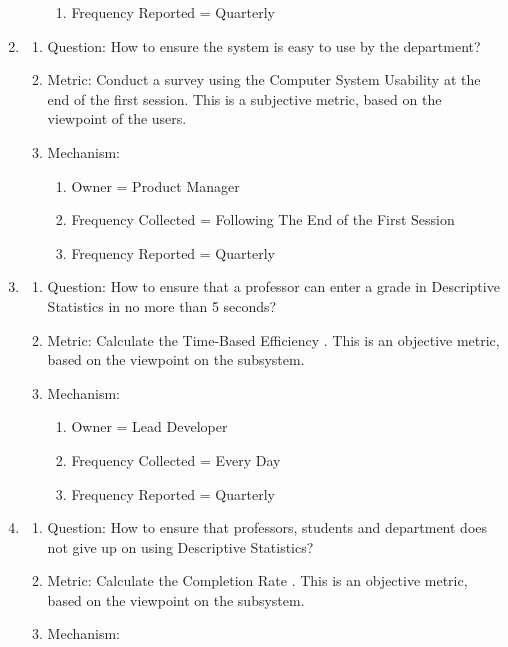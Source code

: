 \documentclass[11pt]{article}
\begin{document}
\begin{enumerate}
\begin{enumerate}
\begin{enumerate}
    \item Frequency Reported = Quarterly
    \end{enumerate}
\end{enumerate}
\item
	\begin{enumerate}
    \item Question: How to ensure the system is easy to use by the department?
    \item Metric: Conduct a survey using the Computer System Usability \cite{mifsud} at the end of the first session. This is a subjective metric, based on the viewpoint of the users.
    \item Mechanism:
	\begin{enumerate}
    \item Owner = Product Manager
    \item Frequency Collected = Following The End of the First Session
    \item Frequency Reported = Quarterly
    \end{enumerate}
\end{enumerate}
\item
	\begin{enumerate}
    \item Question: How to ensure that a professor can enter a grade in Descriptive Statistics in no more than 5 seconds?
    \item Metric: Calculate the Time-Based Efficiency \cite{mifsud}. This is an objective metric, based on the viewpoint on the subsystem.
    \item Mechanism:
	\begin{enumerate}
    \item Owner = Lead Developer
    \item Frequency Collected = Every Day
    \item Frequency Reported = Quarterly
    \end{enumerate}
\end{enumerate}
\item
	\begin{enumerate}
    \item Question: How to ensure that professors, students and department does not give up on using Descriptive Statistics?
    \item Metric: Calculate the Completion Rate \cite{sauro2}. This is an objective metric, based on the viewpoint on the subsystem.
    \item Mechanism:
	\begin{enumerate}

\end{enumerate}
\end{enumerate}
\end{enumerate}
\end{document}
